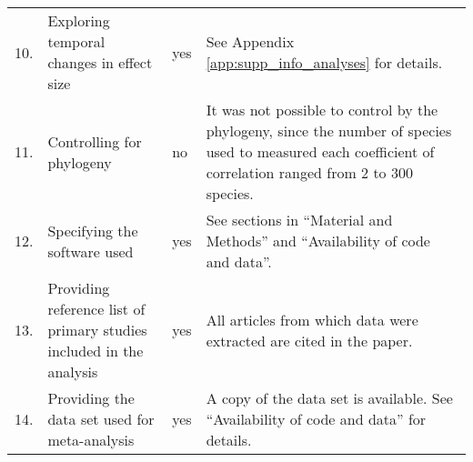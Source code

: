 \documentclass[a4paper,11pt]{article}
\begin{document}
\begin{table}[h!]
{\begin{tabular}{p{0.2cm}p{4cm}p{0.8cm}p{7cm}}
  10.& Exploring temporal changes in effect size &	yes	& See Appendix \ref{app:supp_info_analyses} for details.\\
  11.& Controlling for phylogeny &	no &	It was not possible to control by the phylogeny, since the number of species used to measured each coefficient of correlation ranged from 2 to 300 species.\\
  12.& Specifying the software used &	yes	& See sections in ``Material and Methods'' and ``Availability of code and data''.\\
 13.& Providing reference list of primary studies included in the analysis &	yes &	All articles from which data were extracted are cited in the paper.\\
  14.& Providing the data set used for meta-analysis  &	yes &	A copy of the data set is available. See ``Availability of code and data'' for details.\\
   \hline
\end{tabular}
}
\label{tab:meta}
\end{table}
\end{document}
